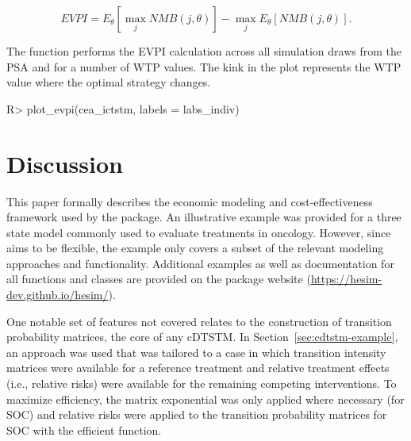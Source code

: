 \documentclass[article, nojss]{jss}\usepackage[]{graphicx}\usepackage[]{color}
\begin{document}
\begin{equation}
EVPI = E_\theta \left[\max_j NMB(j, \theta)\right] - \max_j E_\theta \left [ NMB(j, \theta)\right].
\end{equation}

The  function performs the EVPI calculation across all simulation draws from the PSA and for a number of WTP values. The kink in the plot represents the WTP value where the optimal strategy changes.

\begin{Schunk}
\begin{Sinput}
R> plot_evpi(cea_ictstm, labels = labs_indiv)
\end{Sinput}
\end{Schunk}

\section{Discussion} \label{sec:discussion}
This paper formally describes the economic modeling and cost-effectiveness framework used by the  package. An illustrative example was provided for a three state model commonly used to evaluate treatments in oncology. However, since  aims to be flexible, the example only covers a subset of the relevant modeling approaches and functionality. Additional examples as well as documentation for all functions and classes are provided on the package website (\url{https://hesim-dev.github.io/hesim/}). 

One notable set of features not covered relates to the construction of transition probability matrices, the core of any cDTSTM. In Section~\ref{sec:cdtstm-example}, an approach was used that was tailored to a case in which transition intensity matrices were available for a reference treatment and relative treatment effects (i.e., relative risks) were available for the remaining competing interventions. To maximize efficiency, the matrix exponential was only applied where necessary (for SOC) and relative risks were applied to the transition probability matrices for SOC with the efficient  function. 
\end{document}
